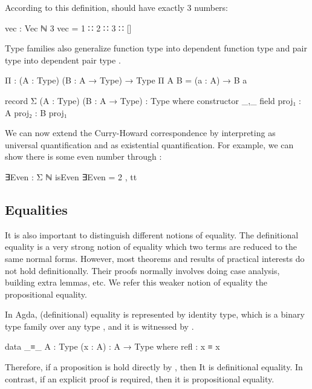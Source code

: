 According to this definition,    should have exactly 3 numbers:

\begin{code}
vec : Vec ℕ 3
vec = 1 ∷ 2 ∷ 3 ∷ []
\end{code}

Type families also generalize function type  into dependent function type  and pair type  into dependent pair type .

\begin{code}
Π : (A : Type) (B : A → Type) → Type
Π A B = (a : A) → B a

record Σ (A : Type) (B : A → Type) : Type where
  constructor _,_
  field
    proj₁ : A
    proj₂ : B proj₁
\end{code}

We can now extend the Curry-Howard correspondence by interpreting  as universal quantification and  as existential quantification. For example, we can show there is some even number through :

\begin{code}
∃Even : Σ ℕ isEven
∃Even = 2 , tt
\end{code}

\subsection*{Equalities}

It is also important to distinguish different notions of equality. The definitional equality is a very strong notion of equality which two terms are reduced to the same normal forms. However, most theorems and results of practical interests do not hold definitionally. Their proofs normally involves doing case analysis, building extra lemmas, etc. We refer this weaker notion of equality the propositional equality.

In Agda, (definitional) equality is represented by identity type, which is a binary type family over any type , and it is witnessed by .

\begin{code}
data _≡_ {A : Type} (x : A) : A → Type where
  refl : x ≡ x
\end{code}

Therefore, if a proposition is hold directly by , then It is definitional equality. In contrast, if an explicit proof is required, then it is propositional equality.

